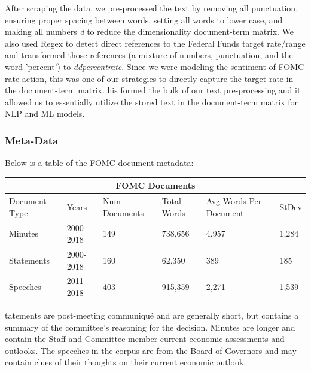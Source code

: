 \documentclass[11pt]{article}
\newcommand{\vertSpace}[1]{\vspace{3mm}}
\begin{document}
{After scraping the data, we pre-processed the text by removing all punctuation, ensuring proper spacing between words, setting all words to lower case, and making all numbers \textit{d} to reduce the dimensionality document-term matrix.  We also used Regex to detect direct references to the Federal Funds target rate/range and transformed those references (a mixture of numbers, punctuation, and the word 'percent') to \textit{ddpercentrate}.  Since we were modeling the sentiment of FOMC rate action, this was one of our strategies to directly capture the target rate in the document-term matrix. \vertSpace


This formed the bulk of our text pre-processing and it allowed us to essentially utilize the stored text in the document-term matrix for NLP and ML models. 

\subsubsection{Meta-Data}
\noindent Below is a table of the FOMC document metadata: 

\vertSpace

\noindent \begin{tabular}{ |p{2cm}||p{2cm}|p{2cm}|p{2cm}|p{2cm}|p{2cm}|  }
 \hline
 \multicolumn{6}{|c|}{FOMC Documents} \\
 \hline
 Document Type& Years & Num Documents & Total Words & Avg Words Per Document & StDev\\
 \hline
 Minutes   & 2000-2018    & 149 & 738,656 & 4,957 & 1,284\\
 Statements &   2000-2018  & 160   & 62,350 & 389 & 185\\
 Speeches & 2011-2018 & 403 & 915,359 & 2,271 & 1,539\\
 \hline
\end{tabular}

\vertSpace

Statements are post-meeting communiqu\'e and are generally short, but contains a summary of the committee's reasoning for the decision.  Minutes are longer and contain the Staff and Committee member current economic assessments and outlooks.  The speeches in the corpus are from the Board of Governors and may contain clues of their thoughts on their current economic outlook.  \vertSpace




\subsection{Latent Dirichlet Allocation}

}
\end{document}
